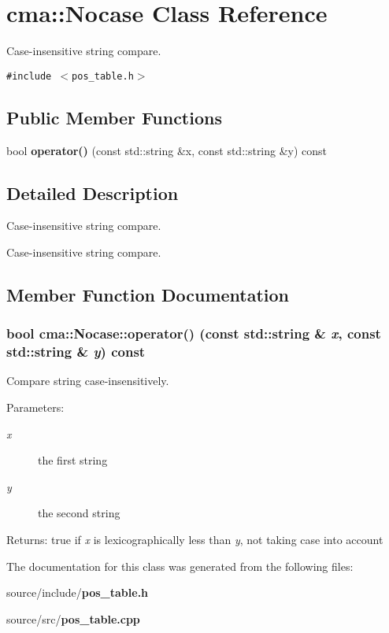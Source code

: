 \section{cma::Nocase Class Reference}
\label{classcma_1_1Nocase}
Case-insensitive string compare.  


{\tt \#include $<$pos\_\-table.h$>$}

\subsection*{Public Member Functions}
\begin{CompactItemize}
\item 
bool {\bf operator()} (const std::string \&x, const std::string \&y) const 
\end{CompactItemize}


\subsection{Detailed Description}
Case-insensitive string compare. 

Case-insensitive string compare. 

\subsection{Member Function Documentation}
\subsubsection{\setlength{\rightskip}{0pt plus 5cm}bool cma::Nocase::operator() (const std::string \& {\em x}, \/  const std::string \& {\em y}) const}\label{classcma_1_1Nocase_26ede1cd9f2d4ee5796af335019014e1}


Compare string case-insensitively. \begin{Desc}
\item[Parameters:]
\begin{description}
\item[{\em x}]the first string \item[{\em y}]the second string \end{description}
\end{Desc}
\begin{Desc}
\item[Returns:]true if {\em x\/} is lexicographically less than {\em y\/}, not taking case into account \end{Desc}


The documentation for this class was generated from the following files:\begin{CompactItemize}
\item 
source/include/{\bf pos\_\-table.h}\item 
source/src/{\bf pos\_\-table.cpp}\end{CompactItemize}

